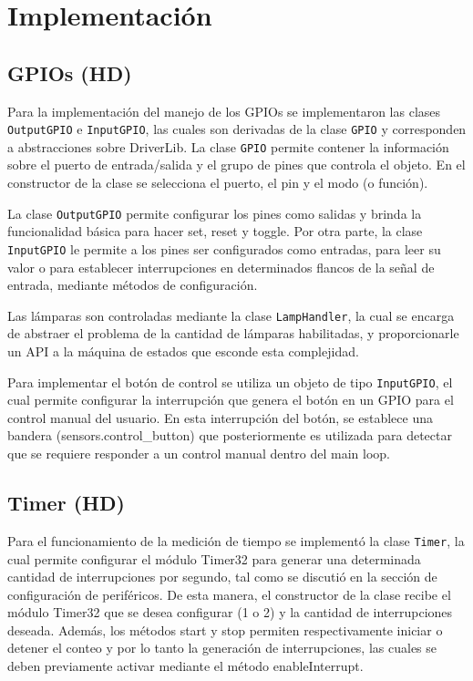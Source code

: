 \section{Implementación}

\subsection{GPIOs (HD)}
Para la implementación del manejo de los GPIOs se implementaron las clases \texttt{OutputGPIO} e
\texttt{InputGPIO}, las cuales son derivadas de la clase \texttt{GPIO} y corresponden a
abstracciones sobre DriverLib. La clase \texttt{GPIO} permite contener la información sobre el
puerto de entrada/salida y el grupo de pines que controla el objeto. En el constructor de la clase
se selecciona el puerto, el pin y el modo (o función). 

La clase \texttt{OutputGPIO} permite configurar los pines como salidas y brinda la funcionalidad
básica para hacer set, reset y toggle. Por otra parte, la clase \texttt{InputGPIO} le permite a los
pines ser configurados como entradas, para leer su valor o para establecer interrupciones en
determinados flancos de la señal de entrada, mediante métodos de configuración.

Las lámparas son controladas mediante la clase \texttt{LampHandler}, la cual se encarga de abstraer
el problema de la cantidad de lámparas habilitadas, y proporcionarle un API a la máquina de estados
que esconde esta complejidad.

Para implementar el botón de control se utiliza un objeto de tipo \texttt{InputGPIO}, el cual
permite configurar la interrupción que genera el botón en un GPIO para el control manual del
usuario. En esta interrupción del botón, se establece una bandera (sensors.control\_button) que
posteriormente es utilizada para detectar que se requiere responder a un control manual dentro del
main loop.

\subsection{Timer (HD)}
Para el funcionamiento de la medición de tiempo se implementó la clase \texttt{Timer}, la cual
permite configurar el módulo Timer32 para generar una determinada cantidad de interrupciones por
segundo, tal como se discutió en la sección de configuración de periféricos. De esta manera, el
constructor de la clase recibe el módulo Timer32 que se desea configurar (1 o 2) y la cantidad de
interrupciones deseada. Además, los métodos start y stop permiten respectivamente iniciar o detener
el conteo y por lo tanto la generación de interrupciones, las cuales se deben previamente activar
mediante el método enableInterrupt. 


